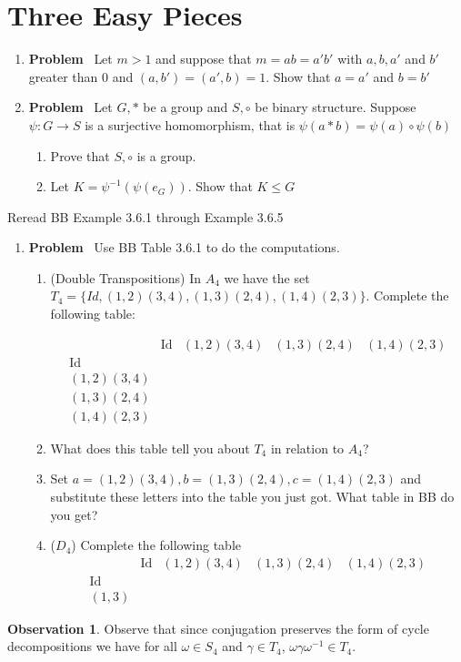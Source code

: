 \documentclass[12pt]{amsart}
\newcommand{\benu}{\begin{enumerate}}
\newcommand{\eenu}{\end{enumerate}}
\theoremstyle{definition}
\newtheorem{observation}[theorem]{Observation}
\newcommand{\bo}{\begin{observation}}
\newcommand{\eo}{\end{observation}}
\DeclareMathOperator{\Id}{Id}
\newcommand{\itep}{\item {\bfseries Problem}\ }
\begin{document}
\section{Three Easy Pieces}
\begin{enumerate}[series=p]
\itep 
\label{drp}Let $m>1$ and suppose that $m=ab=a'b'$ with $a,b,a'$ and $b'$ greater than $0$ and $(a,b')=(a',b)=1$. Show that  $a=a'$ and $b=b'$
\itep
Let $G,\ast$ be a group and $S,\circ$ be binary structure. Suppose $\psi\colon G\to S$ is a surjective homomorphism, that is $\psi(a\ast b)=\psi(a)\circ\psi(b)$
\benu
\item Prove that $S,\circ$ is a group.
\item Let $K=\psi^{-1}(\psi(e_G))$. Show that $K\leq G$
\eenu
\end{enumerate}
Reread BB Example 3.6.1 through Example 3.6.5
\begin{enumerate}[resume=p]
\itep \label{D4comp} Use BB Table 3.6.1 to do the computations.
\benu
\item (Double Transpositions) \label{dt} In $A_4$ we have the set $T_4=\{Id,(1,2)(3,4),(1,3)(2,4),(1,4)(2,3)\}$. Complete the following table:

\begin{equation*}
\begin{array}{c|c|c|c|c}
	& \Id	&(1,2)(3,4)&(1,3)(2,4)&(1,4)(2,3)\\
\hline
\Id	&	&	&	&\\
\hline
(1,2)(3,4)	&	&	&	&\\
\hline
(1,3)(2,4)&	&	&	&\\
\hline	
(1,4)(2,3)&	&	&	&
\end{array}				
\end{equation*}
\item What does this table tell you about $T_4$ in relation to $A_4$?
\item Set $a=(1,2)(3,4),b=(1,3)(2,4),c=(1,4)(2,3)$ and substitute these letters into the table you just got. What table in BB do you get?
\item ($D_4$) Complete the following table
\begin{equation*} 
\begin{array}{c|c|c|c|c}
	&\Id	&(1,2)(3,4)	&(1,3)(2,4)	&(1,4)(2,3)	 \\
\hline	
	\Id&	&	&	&	\\
\hline	
	(1,3)&	&	&	&
\end{array}
\end{equation*}

\eenu
\end{enumerate}
\bo Observe that since conjugation preserves the form of cycle decompositions we have for all $\omega\in S_4$ and $\gamma\in T_4$, $\omega\gamma\omega^{-1}\in T_4$.
\eo
\end{document}
